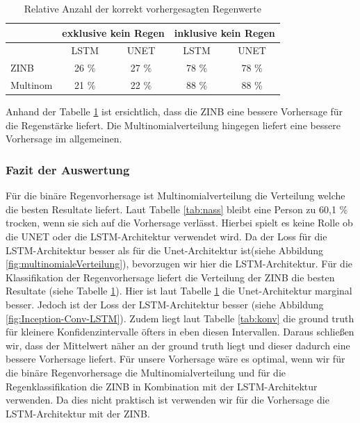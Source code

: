 \begin{table}[h]
\centering
\begin{tabular}[h]{|l|c|c|c|c|}
\hline
&\multicolumn{2}{c}{exklusive kein Regen} &
\multicolumn{2}{c|}{inklusive kein Regen} \\
\hline
& LSTM & UNET & LSTM & UNET \\
\hline
ZINB & 26 \% & 27 \% & 78 \% & 78 \% \\
Multinom & 21 \% & 22 \% & 88 \% & 88 \% \\
\hline
\end{tabular}
\caption{Relative Anzahl der korrekt vorhergesagten Regenwerte\label{tab:raintable}}
\end{table}

\noindent Anhand der Tabelle \ref{tab:raintable} ist ersichtlich, dass die ZINB eine bessere Vorhersage für die Regenstärke liefert. Die Multinomialverteilung hingegen liefert eine bessere Vorhersage im allgemeinen.

\subsubsection{Fazit der Auswertung}

Für die binäre Regenvorhersage ist Multinomialverteilung die Verteilung welche die besten Resultate liefert. Laut Tabelle \ref{tab:nass} bleibt eine Person zu 60,1 \% trocken, wenn sie sich auf die Vorhersage verlässt. Hierbei spielt es keine Rolle ob die UNET oder die LSTM-Architektur verwendet wird. Da der Loss für die LSTM-Architektur besser als für die Unet-Architektur ist(siehe Abbildung \ref{fig:multinomialeVerteilung}), bevorzugen wir hier die LSTM-Architektur. Für die Klassifikation der Regenvorhersage liefert die Verteilung der ZINB die besten Resultate (siehe Tabelle \ref{tab:raintable}). Hier ist laut Tabelle \ref{tab:raintable} die Unet-Architektur marginal besser. Jedoch ist der Loss der LSTM-Architektur besser (siehe Abbildung \ref{fig:Inception-Conv-LSTM}). Zudem liegt laut Tabelle \ref{tab:konv} die ground truth für kleinere Konfidenzintervalle öfters in eben diesen Intervallen. Daraus schließen wir, dass der Mittelwert näher an der ground truth liegt und dieser dadurch eine bessere Vorhersage liefert. Für unsere Vorhersage wäre es optimal, wenn wir für die binäre Regenvorhersage die Multinomialverteilung und für die Regenklassifikation die ZINB in Kombination mit der LSTM-Architektur verwenden. Da dies nicht praktisch ist verwenden wir für die Vorhersage die LSTM-Architektur mit der ZINB.


